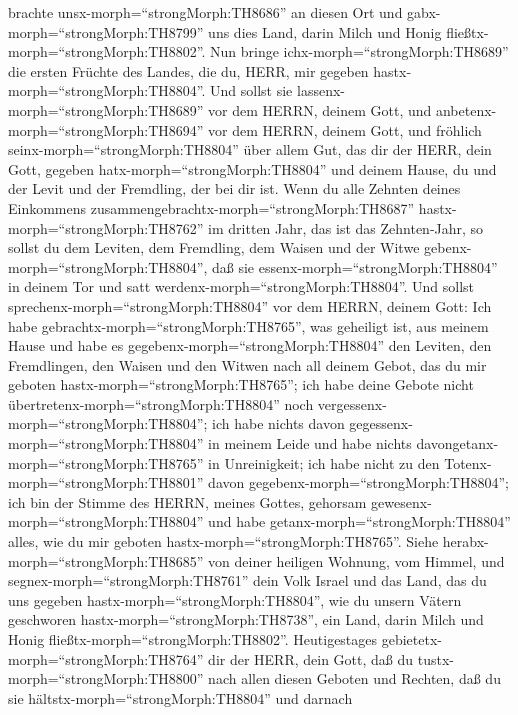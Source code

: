 brachte unsx-morph=``strongMorph:TH8686'' an diesen Ort und
gabx-morph=``strongMorph:TH8799'' uns dies Land, darin Milch und Honig
fließtx-morph=``strongMorph:TH8802''.  Nun bringe
ichx-morph=``strongMorph:TH8689'' die ersten Früchte des Landes, die du,
HERR, mir gegeben hastx-morph=``strongMorph:TH8804''. Und sollst sie
lassenx-morph=``strongMorph:TH8689'' vor dem HERRN, deinem Gott, und
anbetenx-morph=``strongMorph:TH8694'' vor dem HERRN, deinem Gott,
 und fröhlich seinx-morph=``strongMorph:TH8804'' über allem
Gut, das dir der HERR, dein Gott, gegeben
hatx-morph=``strongMorph:TH8804'' und deinem Hause, du und der Levit und
der Fremdling, der bei dir ist.  Wenn du alle Zehnten
deines Einkommens zusammengebrachtx-morph=``strongMorph:TH8687''
hastx-morph=``strongMorph:TH8762'' im dritten Jahr, das ist das
Zehnten-Jahr, so sollst du dem Leviten, dem Fremdling, dem Waisen und
der Witwe gebenx-morph=``strongMorph:TH8804'', daß sie
essenx-morph=``strongMorph:TH8804'' in deinem Tor und satt
werdenx-morph=``strongMorph:TH8804''.  Und sollst
sprechenx-morph=``strongMorph:TH8804'' vor dem HERRN, deinem Gott: Ich
habe gebrachtx-morph=``strongMorph:TH8765'', was geheiligt ist, aus
meinem Hause und habe es gegebenx-morph=``strongMorph:TH8804'' den
Leviten, den Fremdlingen, den Waisen und den Witwen nach all deinem
Gebot, das du mir geboten hastx-morph=``strongMorph:TH8765''; ich habe
deine Gebote nicht übertretenx-morph=``strongMorph:TH8804'' noch
vergessenx-morph=``strongMorph:TH8804'';  ich habe nichts
davon gegessenx-morph=``strongMorph:TH8804'' in meinem Leide und habe
nichts davongetanx-morph=``strongMorph:TH8765'' in Unreinigkeit; ich
habe nicht zu den Totenx-morph=``strongMorph:TH8801'' davon
gegebenx-morph=``strongMorph:TH8804''; ich bin der Stimme des HERRN,
meines Gottes, gehorsam gewesenx-morph=``strongMorph:TH8804'' und habe
getanx-morph=``strongMorph:TH8804'' alles, wie du mir geboten
hastx-morph=``strongMorph:TH8765''.  Siehe
herabx-morph=``strongMorph:TH8685'' von deiner heiligen Wohnung, vom
Himmel, und segnex-morph=``strongMorph:TH8761'' dein Volk Israel und das
Land, das du uns gegeben hastx-morph=``strongMorph:TH8804'', wie du
unsern Vätern geschworen hastx-morph=``strongMorph:TH8738'', ein Land,
darin Milch und Honig fließtx-morph=``strongMorph:TH8802''.
 Heutigestages gebietetx-morph=``strongMorph:TH8764'' dir
der HERR, dein Gott, daß du tustx-morph=``strongMorph:TH8800'' nach
allen diesen Geboten und Rechten, daß du sie
hältstx-morph=``strongMorph:TH8804'' und darnach
